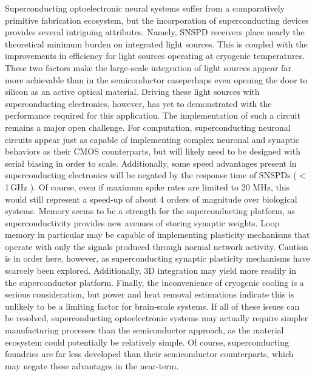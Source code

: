 \documentclass[twocolumn]{article}
\begin{document}
Superconducting optoelectronic neural systems suffer from a comparatively primitive fabrication ecosystem, but the incorporation of superconducting devices provides several intriguing attributes. Namely, SNSPD receivers place nearly the theoretical minimum burden on integrated light sources. This is coupled with the improvements in efficiency for light sources operating at cryogenic temperatures. These two factors make the large-scale integration of light sources appear far more achievable than in the semiconductor case\textemdash perhaps even opening the door to silicon as an active optical material. Driving these light sources with superconducting electronics, however, has yet to demonstrated with the performance required for this application. The implementation of such a circuit remains a major open challenge. For computation, superconducting neuronal circuits appear just as capable of implementing complex neuronal and synaptic behaviors as their CMOS counterparts, but will likely need to be designed with serial biasing in order to scale. Additionally, some speed advantages present in superconducting electronics will be negated by the response time of SNSPDs ($<$1\,GHz ). Of course, even if maximum spike rates are limited to 20 MHz, this would still represent a speed-up of about 4 orders of magnitude over biological systems. Memory seems to be a strength for the superconducting platform, as superconductivity provides new avenues of storing synaptic weights. Loop memory in particular may be capable of implementing plasticity mechanisms that operate with only the signals produced through normal network activity. Caution is in order here, however, as superconducting synaptic plasticity mechanisms have scarcely been explored. Additionally, 3D integration may yield more readily in the superconductor platform. Finally, the inconvenience of cryogenic cooling is a serious consideration, but power and heat removal estimations indicate this is unlikely to be a limiting factor for brain-scale systems. If all of these issues can be resolved, superconducting optoelectronic systems may actually require simpler manufacturing processes than the semiconductor approach, as the material ecosystem could potentially be relatively simple. Of course, superconducting foundries are far less developed than their semiconductor counterparts, which may negate these advantages in the near-term.
\end{document}
